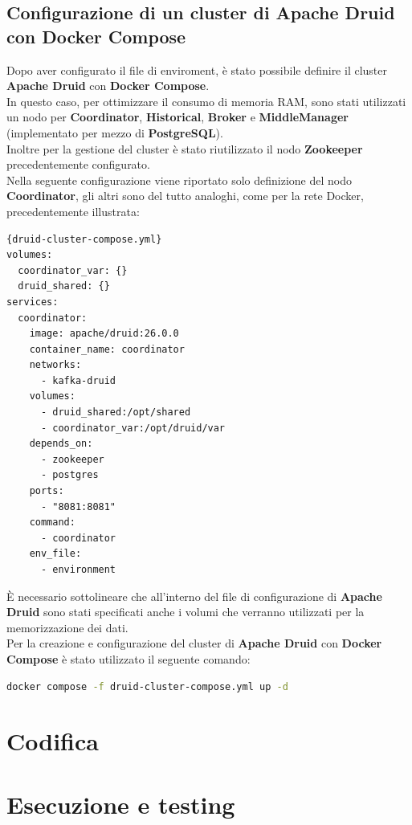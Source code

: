 \subsection{Configurazione di un cluster di Apache Druid con Docker Compose}
Dopo aver configurato il file di \gls{enviroment}{}, 
è stato possibile definire il \gls{cluster}{} \textbf{Apache Druid} con \textbf{Docker Compose}.\\
In questo caso, per ottimizzare il consumo di memoria RAM, sono stati utilizzati un nodo per \textbf{Coordinator}, \textbf{Historical}, \textbf{Broker} e \textbf{MiddleManager} (implementato per mezzo di \textbf{PostgreSQL}).\\
Inoltre per la gestione del \gls{cluster}{} è stato riutilizzato il nodo \textbf{Zookeeper} precedentemente configurato. \\
Nella seguente configurazione viene riportato solo definizione del nodo \textbf{Coordinator}, gli altri sono del tutto analoghi, come per la rete \gls{Docker}{}, precedentemente illustrata:
\pagebreak
\begin{lstlisting}[caption=\texttt{druid-cluster-compose.yml}, label=lst:file]{druid-cluster-compose.yml}
volumes:
  coordinator_var: {}
  druid_shared: {}
services:
  coordinator:
    image: apache/druid:26.0.0
    container_name: coordinator
    networks:
      - kafka-druid
    volumes:
      - druid_shared:/opt/shared
      - coordinator_var:/opt/druid/var
    depends_on:
      - zookeeper
      - postgres
    ports:
      - "8081:8081"
    command:
      - coordinator
    env_file:
      - environment
\end{lstlisting}
È necessario sottolineare che all'interno del file di configurazione di \textbf{Apache Druid} sono stati specificati anche i \gls{volumi}{} che verranno utilizzati per la memorizzazione dei dati.
\\Per la creazione e configurazione del \gls{cluster}{} di \textbf{Apache Druid} con \textbf{Docker Compose} è stato utilizzato il seguente comando:
\begin{lstlisting}[language=bash]
    docker compose -f druid-cluster-compose.yml up -d
\end{lstlisting}
\section{Codifica}

\section{Esecuzione e testing}

\newpage
\pagestyle{empty}
\null %
\newpage